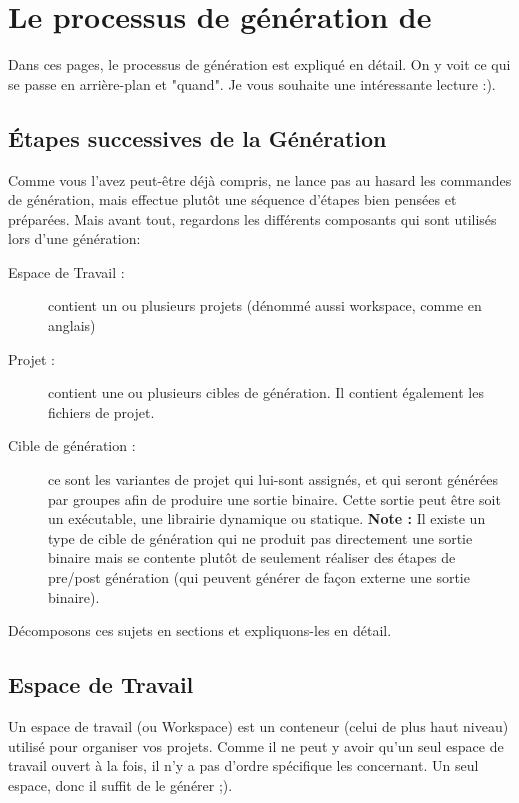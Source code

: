 \section{Le processus de génération de \codeblocks}\label{sec:build_process}

Dans ces pages, le processus de génération est expliqué en détail. On y voit ce qui se passe en arrière-plan et "quand". Je vous souhaite une intéressante lecture :).
 
\subsection{Étapes successives de la Génération}

Comme vous l'avez peut-être déjà compris, \codeblocks ne lance pas au hasard les commandes de génération, mais effectue plutôt une séquence d'étapes bien pensées et préparées. Mais avant tout, regardons les différents composants qui sont utilisés lors d'une génération:

\begin{description}
\item [Espace de Travail :] contient un ou plusieurs projets (dénommé aussi workspace, comme en anglais)
\item [Projet :] contient une ou plusieurs cibles de génération. Il contient également les fichiers de projet.
\item [Cible de génération :] ce sont les variantes de projet qui lui-sont assignés, et qui seront générées par groupes afin de produire une sortie binaire. Cette sortie peut être soit un exécutable, une librairie  dynamique ou statique. \textbf{Note :} Il existe un type de cible de génération qui ne produit pas directement une sortie binaire mais se contente plutôt de seulement réaliser des étapes de pre/post génération (qui peuvent générer de façon externe une sortie binaire).
\end{description}

Décomposons ces sujets en sections et expliquons-les en détail.

\subsection{Espace de Travail}

Un espace de travail (ou Workspace) est un conteneur (celui de plus haut niveau) utilisé pour organiser vos projets. Comme il ne peut y avoir qu'un seul espace de travail ouvert à la fois, il n'y a pas d'ordre spécifique les concernant. Un seul espace, donc il suffit de le générer ;).

